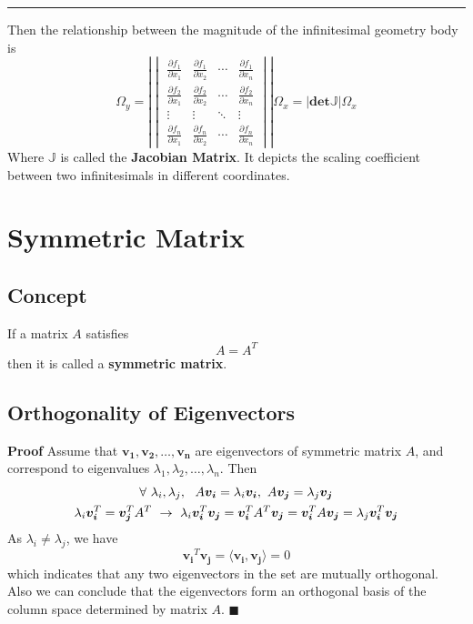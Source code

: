 \documentclass[11pt]{article}
\begin{document}
\rule{\textwidth}{0.3mm}
Then the relationship between the magnitude of the infinitesimal geometry body is
\begin{equation}
    \Omega_y = \left|\begin{vmatrix}
    \frac{\partial f_{1}}{\partial x_1} & \frac{\partial f_{1}}{\partial x_2} & \cdots & \frac{\partial f_{1}}{\partial x_n} \\
    \frac{\partial f_{2}}{\partial x_1} & \frac{\partial f_{2}}{\partial x_2} & \cdots & \frac{\partial f_{2}}{\partial x_n} \\
    \vdots & \vdots & \ddots & \vdots \\
    \frac{\partial f_{n}}{\partial x_1} & \frac{\partial f_{n}}{\partial x_2} & \cdots & \frac{\partial f_{n}}{\partial x_n}
    \end{vmatrix}\right| \Omega_x = |\bm{det}\mathbb{J}| \Omega_x
\end{equation}
Where $\mathbb{J}$ is called the \textbf{Jacobian Matrix}. It depicts the scaling coefficient between two infinitesimals in different coordinates.
\section{Symmetric Matrix}
\subsection{Concept}
If a matrix $A$ satisfies
\begin{equation}
    A = A^T
\end{equation}
then it is called a \textbf{symmetric matrix}.
\subsection{Orthogonality of Eigenvectors}
\noindent {} \par \noindent 
\textbf{Proof} Assume that $\bm{v_1}, \bm{v_2}, \dots, \bm{v_n}$ are eigenvectors of symmetric matrix $A$, and correspond to eigenvalues $\lambda_1,\lambda_2,\dots,\lambda_n$. Then
\begin{gather}
    \forall~\lambda_i,\lambda_j,~~A\bm{v_i} = \lambda_i\bm{v_i},~A\bm{v_j} = \lambda_j \bm{v_j} \notag \\
    \lambda_i\bm{v_i}^T = \bm{v_j}^T A^T~\rightarrow~\lambda_i \bm{v_i}^T \bm{v_j} = \bm{v_i}^T A^T\bm{v_j} = \bm{v_i}^T A\bm{v_j} = \lambda_j \bm{v_i}^T \bm{v_j}
\end{gather}
As $\lambda_i \neq \lambda_j$, we have
\begin{equation}
    \bm{v_i}^T \bm{v_j} = \langle \bm{v_i} , \bm{v_j} \rangle = 0
\end{equation}
which indicates that any two eigenvectors in the set are mutually orthogonal. Also we can conclude that the eigenvectors form an orthogonal basis of the column space determined by matrix $A$. \hfill $\blacksquare$ \par \noindent
\end{document}
